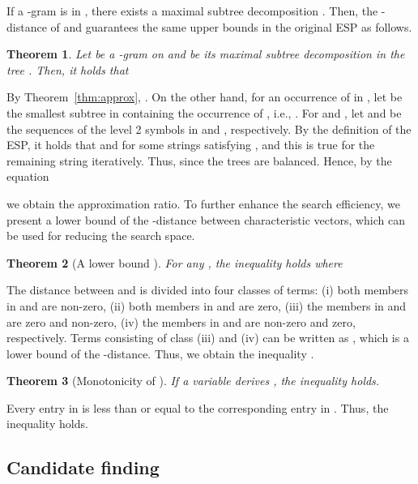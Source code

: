 \documentclass[12pt,a4paper]{scrartcl}
\newtheorem{Theorem}{Theorem}
\newenvironment{Proof}{\trivlist \item[\hskip \labelsep{\bf proof.\/}]}{\hspace{\fill}\endtrivlist }
\begin{document}
If a -gram  is in , there exists a maximal
subtree decomposition .  Then, the
-distance of  and  guarantees
the same upper bounds in the original ESP as follows.

\begin{Theorem}\label{thm:newapprox}
  Let  be a -gram on  and
   be its maximal subtree
  decomposition in the tree .  Then, it holds that

\end{Theorem}
\begin{Proof}
  By Theorem~\ref{thm:approx},
  .  On the other
  hand, for an occurrence of  in , let  be the smallest
  subtree in  containing the occurrence of , i.e.,
  .  For  and , let  and
   be the sequences of the level 2 symbols in  and
  , respectively.  By the definition of the ESP, it holds that
   and  for some
  strings satisfying , and
  this is true for the remaining string  iteratively.  Thus,
   since the trees are balanced.
  Hence, by the equation

we obtain the approximation ratio.
\end{Proof}
To further enhance the search efficiency, we present a lower bound of the
-distance between characteristic vectors, which can be used for reducing
the search space.

\begin{Theorem}[A lower bound ]\label{thm:lower}
For any , 
the inequality  holds where

\end{Theorem}
\begin{Proof}
  The  distance between  and  is divided into four classes of terms: (i) both members in  and  are non-zero, 
(ii) both members in  and  are zero, 
(iii) the members in  and  are zero and non-zero, 
(iv) the members in  and  are non-zero and zero, respectively.  
Terms consisting of class (iii) and (iv) can be written as , which is a lower bound of the -distance.  
Thus, we obtain the inequality . 
\end{Proof}
 

\begin{Theorem}[Monotonicity of ] \label{thm:mon}
If a variable  derives , the inequality  holds. 
\end{Theorem}
\begin{Proof}
Every entry in  is less than or equal to the corresponding entry in . Thus, the inequality holds. 
\end{Proof}

\subsection{Candidate finding}
\end{document}
